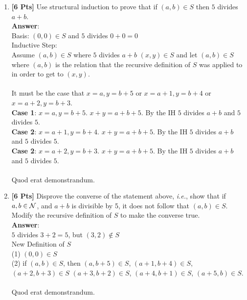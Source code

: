 \begin{enumerate}
\begin{enumerate}

\item {\bf [6 Pts]} Use structural induction to prove that if $(a,b) \in S$ then $5$ divides $a + b$.\\
\textbf{Answer}:\\

Basis: $(0,0) \in S$ and $5$ divides $0+0=0$\\

Inductive Step:\\
Assume $(a,b) \in S$ where $5$ divides $a + b$
$(x,y) \in S$ and let $(a,b) \in S$ where $(a,b)$ is the relation that the recursive definition of $S$ was applied to in order to get to $(x,y)$.\\\\
It must be the case that $x = a, y = b+5$ or $x = a+1, y = b+4$ or $x = a+2, y = b+3$.\\

\textbf{Case 1}:  $x = a, y = b+5$. $x + y = a + b + 5$. By the IH $5$ divides $a + b$ and $5$ divides $5$.\\
\textbf{Case 2}:  $x = a+1, y = b+4$. $x + y = a + b + 5$. By the IH $5$ divides $a + b$ and $5$ divides $5$.\\
\textbf{Case 2}:  $x = a+2, y = b+3$. $x + y = a + b + 5$. By the IH $5$ divides $a + b$ and $5$ divides $5$.\\\\
Quod erat demonstrandum.\\

\item {\bf [6 Pts]} Disprove the converse of the statement above, {\it i.e.}, show that if $a,b \in \cal N$, and $a+b$ is divisible by 5, it does not follow that $(a,b) \in S$. Modify the recursive definition of $S$ to make the converse true.\\
\textbf{Answer}:\\

$5$ divides $3+2 = 5$, but $(3,2) \notin S$\\

New Definition of $S$\\

(1) $(0,0) \in S$\\
(2) if $(a,b) \in S$, then 
$(a,b+5) \in S$, 
$(a+1,b+4) \in S$, 
$(a+2,b+3) \in S$ 
$(a+3,b+2) \in S$,  
$(a+4,b+1) \in S$,  
$(a+5,b) \in S$.\\\\
Quod erat demonstrandum.\\


\end{enumerate}
\end{enumerate}
